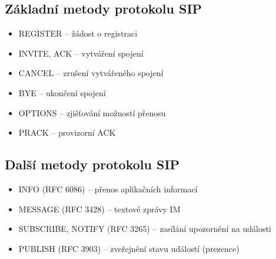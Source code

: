 \subsection{Základní metody protokolu SIP}
\begin{itemize}
    \item REGISTER -- žádost o registraci
    \item INVITE, ACK -- vytváření spojení
    \item CANCEL -- zrušení vytvářeného spojení
    \item BYE -- ukončení spojení
    \item OPTIONS -- zjišťování možností přenosu
    \item PRACK -- provizorní ACK
\end{itemize}

\subsection{Další metody protokolu SIP}
\begin{itemize}
    \item INFO (RFC 6086) – přenos aplikačních informací
    \item MESSAGE (RFC 3428) – textové zprávy IM
    \item SUBSCRIBE, NOTIFY (RFC 3265) – zasílání upozornění na události
    \item PUBLISH (RFC 3903) – zveřejnění stavu událostí (prezence)
\end{itemize}


